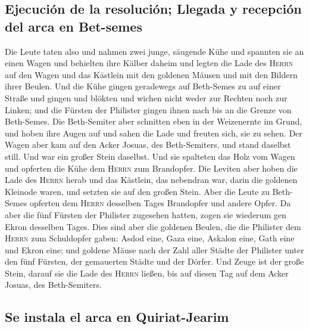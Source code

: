 \hypertarget{ejecuciuxf3n-de-la-resoluciuxf3n-llegada-y-recepciuxf3n-del-arca-en-bet-semes}{%
\subsection{Ejecución de la resolución; Llegada y recepción del arca en
Bet-semes}\label{ejecuciuxf3n-de-la-resoluciuxf3n-llegada-y-recepciuxf3n-del-arca-en-bet-semes}}

 Die Leute taten also und nahmen zwei junge, säugende
Kühe und spannten sie an einen Wagen und behielten ihre Kälber daheim
 und legten die Lade des \textsc{Herrn} auf den Wagen und
das Kästlein mit den goldenen Mäusen und mit den Bildern ihrer Beulen.
 Und die Kühe gingen geradewegs auf Beth-Semes zu auf
einer Straße und gingen und blökten und wichen nicht weder zur Rechten
noch zur Linken; und die Fürsten der Philister gingen ihnen nach bis an
die Grenze von Beth-Semes.  Die Beth-Semiter aber
schnitten eben in der Weizenernte im Grund, und hoben ihre Augen auf und
sahen die Lade und freuten sich, sie zu sehen.  Der Wagen
aber kam auf den Acker Josuas, des Beth-Semiters, und stand daselbst
still. Und war ein großer Stein daselbst. Und sie spalteten das Holz vom
Wagen und opferten die Kühe dem \textsc{Herrn} zum Brandopfer.
 Die Leviten aber hoben die Lade des \textsc{Herrn} herab
und das Kästlein, das nebendran war, darin die goldenen Kleinode waren,
und setzten sie auf den großen Stein. Aber die Leute zu Beth-Semes
opferten dem \textsc{Herrn} desselben Tages Brandopfer und andere Opfer.
 Da aber die fünf Fürsten der Philister zugesehen hatten,
zogen sie wiederum gen Ekron desselben Tages.  Dies sind
aber die goldenen Beulen, die die Philister dem \textsc{Herrn} zum
Schuldopfer gaben: Asdod eine, Gaza eine, Askalon eine, Gath eine und
Ekron eine;  und goldene Mäuse nach der Zahl aller Städte
der Philister unter den fünf Fürsten, der gemauerten Städte und der
Dörfer. Und Zeuge ist der große Stein, darauf sie die Lade des
\textsc{Herrn} ließen, bis auf diesen Tag auf dem Acker Josuas, des
Beth-Semiters.

\hypertarget{se-instala-el-arca-en-quiriat-jearim}{%
\subsection{Se instala el arca en
Quiriat-Jearim}\label{se-instala-el-arca-en-quiriat-jearim}}

